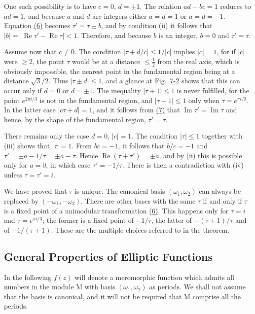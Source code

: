 One such possibility is to have $c = 0$, $d = \pm 1$. The relation $ad - bc = 1$ reduces to $ad = 1$, and because $a$ and $d$ are integers either $a = d = 1$ or $a = d = -1$. Equation \hyperref[eq:7.6]{(6)} becomes $\tau' = \tau \pm b$, and by condition (ii) it follows that $|b| = |\operatorname{Re} \tau' - \operatorname{Re} \tau| < 1$. Therefore, and because $b$ is an integer, $b = 0$ and $\tau' = \tau$.

Assume now that $c \neq 0$. The condition $|\tau + d/c| \leq 1 / |c|$ implies $|c| = 1$, for if $|c|$ were $\geq 2$, the point $\tau$ would be at a distance $\leq \frac{1}{2}$ from the real axis, which is obviously impossible, the nearest point in the fundamental region being at a distance $\sqrt{3}/2$. Thus $|\tau \pm d| \leq 1$, and a glance at Fig.~\hyperref[fig:7-2]{7-2} shows that this can occur only if $d = 0$ or $d = \pm 1$. The inequality $|\tau + 1| \leq 1$ is never fulfilled, for the point $e^{2\pi i/3}$ is not in the fundamental region, and $|\tau - 1| \leq 1$ only when $\tau = e^{\pi i/3}$. In the latter case $|c\tau + d| = 1$, and it follows from \hyperref[eq:7.7]{(7)} that $\operatorname{Im} \tau' = \operatorname{Im} \tau$ and hence, by the shape of the fundamental region, $\tau' = \tau$.

There remains only the case $d = 0$, $|c| = 1$. The condition $|\tau| \leq 1$ together with (iii) shows that $|\tau| = 1$. From $bc = -1$, it follows that $b/c = -1$ and $\tau' = \pm a - 1/\tau = \pm a - \bar{\tau}$. Hence $\operatorname{Re}\left(\tau + \tau'\right) = \pm a$, and by (ii) this is possible only for $a = 0$, in which case $\tau' = -1/\tau$. There is then a contradiction with (iv) unless $\tau = \tau' = i$.

We have proved that $\tau$ is unique. The canonical basis $(\omega_{1},\omega_{2})$ can always be replaced by $(-\omega_{1},-\omega_{2})$. There are other bases with the same $\tau$ if and only if $\tau$ is a fixed point of a unimodular transformation \hyperref[eq:7.6]{(6)}. This happens only for $\tau=i$ and $\tau=e^{\pi i/3}$; the former is a fixed point of $-1/\tau$, the latter of $-(\tau+1)/\tau$ and of $-1/(\tau+1)$. These are the multiple choices referred to in the theorem.


\setcounter{section}{2}\setcounter{subsection}{3}\subsection{General Properties of Elliptic Functions}\label{sec:7.2.4}
In the following $f(z)$ will denote a meromorphic function which admits all numbers in the module M with basis $(\omega_{1},\omega_{2})$ as periods. We shall not assume that the basis is canonical, and it will not be required that M comprise all the periods.

